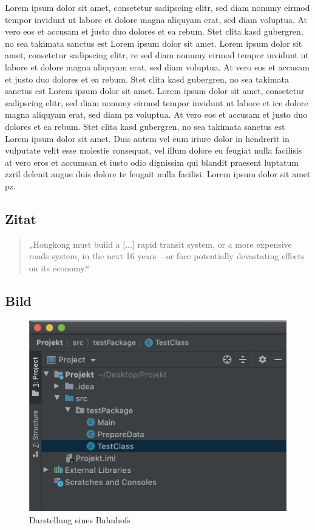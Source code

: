 Lorem ipsum dolor sit amet, consetetur sadipscing elitr, sed diam nonumy eirmod tempor invidunt ut labore et dolore magna aliquyam erat, sed diam voluptua. At vero eos et accusam et justo duo dolores et ea rebum. Stet clita kasd gubergren, no sea takimata  sanctus est Lorem ipsum dolor sit amet. Lorem ipsum dolor sit amet, consetetur sadipscing elitr, \ac{re} sed diam nonumy eirmod tempor invidunt ut labore et dolore magna aliquyam erat, sed diam voluptua. At vero eos et accusam et justo duo dolores et ea rebum. Stet clita kasd gubergren, no sea takimata sanctus est Lorem ipsum dolor sit amet. Lorem ipsum dolor sit amet, consetetur sadipscing elitr, sed diam nonumy eirmod tempor invidunt ut labore et \ac{ice} dolore magna aliquyam erat, sed diam  \ac{pz} voluptua. At vero eos et accusam et justo duo dolores et ea rebum. Stet clita kasd gubergren, no sea takimata sanctus est Lorem ipsum dolor sit amet. Duis autem vel eum iriure dolor in hendrerit in vulputate velit esse molestie consequat, vel illum dolore eu feugiat nulla facilisis at vero eros et accumsan et iusto odio dignissim qui blandit praesent luptatum zzril delenit augue duis dolore te feugait nulla facilisi. Lorem ipsum dolor sit amet \ac{pz}.

\subsection{Zitat}

\begin{quote}
\label{intro}„Hongkong must build a [...] rapid transit system, or a more expensive roads system, in the next 16 years – or face potentially devastating effects on its economy.“
\end{quote}

\subsection{Bild}

\begin{figure}[h]
  \includegraphics[width=\linewidth]{Images/img1.jpg}
  \caption{Darstellung eines Bahnhofs}
\end{figure}

